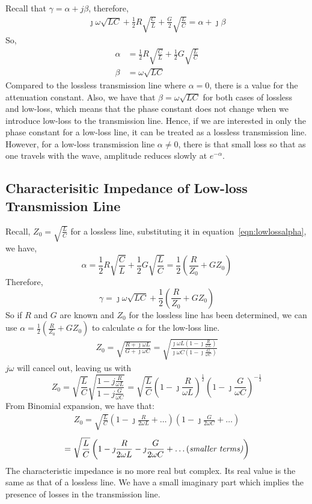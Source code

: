 Recall that $\gamma = \alpha + j\beta$, therefore,
\begin{align*}
\jmath\omega\sqrt{LC} + \frac{1}{2}R\sqrt{\frac{C}{L}} + \frac{G}{2}\sqrt{\frac{L}{C}} = \alpha + \jmath\beta
\end{align*}
So,
\begin{align}
\alpha &= \frac{1}{2}R\sqrt{\frac{C}{L}} + \frac{1}{2}G\sqrt{\frac{L}{C}}\label{eqn:lowlossalpha}\\
\beta &= \omega\sqrt{LC}
\end{align}
Compared to the lossless transmission line where $\alpha = 0$, there is a value for the attenuation constant. Also, we have that $\beta = \omega\sqrt{LC}$ for both cases of lossless and low-loss, which means that the phase constant does not change when we introduce low-loss to the transmission line. Hence, if we are interested in only the phase constant for a low-loss line, it can be treated as a lossless transmission line. However, for a low-loss transmission line $\alpha \neq 0$, there is that small loss so that as one travels with the wave, amplitude reduces slowly at $e^{-\alpha}$.

\subsection{Characterisitic Impedance of Low-loss Transmission Line}
Recall, $Z_0 = \sqrt{\frac{L}{C}}$ for a lossless line, substituting it in equation~\eqref{eqn:lowlossalpha}, we have,
\[\alpha = \frac{1}{2}R\sqrt{\frac{C}{L}} + \frac{1}{2}G\sqrt{\frac{L}{C}} = \frac{1}{2}\left(\frac{R}{Z_0} + GZ_0\right)\]
Therefore,
\[\gamma = \jmath\omega\sqrt{LC} + \frac{1}{2}\left(\frac{R}{Z_0} + GZ_0\right)\]
So if $R$ and $G$ are known and $Z_0$ for the lossless line has been determined, we can use $\alpha = \frac{1}{2}(\frac{R}{Z_0} + GZ_0)$ to calculate $\alpha$ for the low-loss line.
\begin{align*}
Z_0 = \sqrt{\frac{R + \jmath\omega L}{G + \jmath\omega C}} = \sqrt{\frac{\jmath\omega L(1 - \jmath\frac{R}{\omega L})}{\jmath\omega C(1 - \jmath\frac{G}{\omega C})}}
\end{align*}
$j\omega$ will cancel out, leaving us with
\begin{dmath*}
Z_0 = \sqrt{\frac{L}{C}}\sqrt{\frac{1 - j\frac{R}{\omega L}}{1 - j\frac{G}{\omega C}}} =\sqrt{\frac{L}{C}}\left(1 - \jmath\frac{R}{\omega L}\right)^{\frac{1}{2}}\left(1 - \jmath\frac{G}{\omega C}\right)^{-\frac{1}{2}} 
\end{dmath*}
From Binomial expansion, we have that:
\begin{align*}
Z_0 = \sqrt{\frac{L}{C}}\left(1 - \jmath\frac{R}{2\omega L} + \ldots\right)\left(1 - \jmath\frac{G}{2\omega C} + \ldots\right)
\end{align*}
\begin{align*}
= \sqrt{\frac{L}{C}}\left(1 - \jmath\frac{R}{2\omega L} - \jmath\frac{G}{2\omega C} + \text{\ldots (\it{smaller terms})}\right)
\end{align*}
The characteristic impedance is no more real but complex. Its real value is the same as that of a lossless line. We have a small imaginary part which implies the presence of losses in the transmission line.

